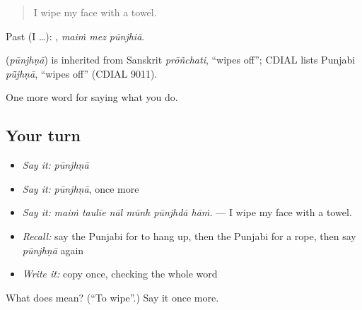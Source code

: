 \begin{quote}
I wipe my face with a towel.
\end{quote}

Past (I …):   , \emph{maiṁ mez pūnjhiā}.

\begin{cousinweb}
\textbf{} (\emph{pūnjhṇā}) is inherited from Sanskrit \emph{prōñchati}, \textquotedblleft{}wipes off\textquotedblright{}; CDIAL lists Punjabi \emph{pū̃jhṇā}, \textquotedblleft{}wipes off\textquotedblright{} (CDIAL 9011).
\end{cousinweb}

\begin{grammarlens}[title={What you've built}]
One more word for saying what you do.
\end{grammarlens}

\subsection*{Your turn}
\begin{itemize}
\raggedright
  \item \emph{Say it:} \emph{pūnjhṇā}
  \item \emph{Say it:} \emph{pūnjhṇā}, once more
  \item \emph{Say it:} \emph{maiṁ taulīe nāl mūnh pūnjhdā hāṁ.} — I wipe my face with a towel.
  \item \emph{Recall:} say the Punjabi for to hang up, then the Punjabi for a rope, then say \emph{pūnjhṇā} again
  \item \emph{Write it:} copy \textbf{} once, checking the whole word
\end{itemize}

\begin{tcolorbox}[breakable,colback=teal!4,colframe=teal!35!black,title={Before you move on}]
What does  mean? (\textquotedblleft{}To wipe\textquotedblright{}.) Say it once more.
\end{tcolorbox}
